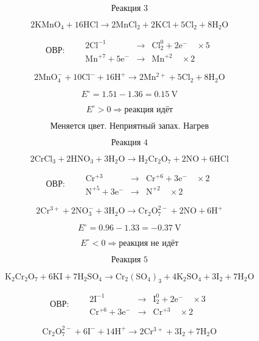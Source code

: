 \documentclass[a4paper, 12pt]{article}
\begin{document}
\[
    \boxed{\text{Реакция 3}}
\]

\[
    \mathrm{2KMnO_4 + 16HCl
        \rightarrow 2MnCl_2 + 2KCl + 5Cl_2 + 8H_2O}
\]

\[
    \text{ОВР:}\qquad
    \begin{array}{rcl}
        \mathrm{2Cl^{-1}}       & \rightarrow & \mathrm{Cl_2^0 + 2e^-} \quad \times 5 \\
        \mathrm{Mn^{+7} + 5e^-} & \rightarrow & \mathrm{Mn^{+2}} \quad \times 2
    \end{array}
\]

\[
    \mathrm{2MnO_4^- + 10Cl^- + 16H^+
        \rightarrow 2Mn^{2+} + 5Cl_2 + 8H_2O}
\]

\[
    E^\circ = 1.51 - 1.36 = 0.15\ \mathrm{V}
\]

\[
    \boxed{E^\circ > 0 \Rightarrow \text{реакция идёт}}
\]

\[
    \text{Меняется цвет. Неприятный запах. Нагрев}
\]

\[
    \boxed{\text{Реакция 4}}
\]

\[
    \mathrm{2CrCl_3 + 2HNO_3 + 3H_2O
        \rightarrow H_2Cr_2O_7 + 2NO + 6HCl}
\]

\[
    \text{ОВР:}\qquad
    \begin{array}{rcl}
        \mathrm{Cr^{+3}}       & \rightarrow & \mathrm{Cr^{+6} + 3e^-} \quad \times 2 \\
        \mathrm{N^{+5} + 3e^-} & \rightarrow & \mathrm{N^{+2}} \quad \times 2
    \end{array}
\]

\[
    \mathrm{2Cr^{3+} + 2NO_3^- + 3H_2O
    \rightarrow Cr_2O_7^{2-} + 2NO + 6H^+}
\]

\[
    E^\circ = 0.96 - 1.33 = -0.37\ \mathrm{V}
\]

\[
    \boxed{E^\circ < 0 \Rightarrow \text{реакция не идёт}}
\]

\[
    \boxed{\text{Реакция 5}}
\]

\[
    \mathrm{K_2Cr_2O_7 + 6KI + 7H_2SO_4
        \rightarrow Cr_2(SO_4)_3 + 4K_2SO_4 + 3I_2 + 7H_2O}
\]

\[
    \text{ОВР:}\qquad
    \begin{array}{rcl}
        \mathrm{2I^{-1}}        & \rightarrow & \mathrm{I_2^0 + 2e^-} \quad \times 3 \\
        \mathrm{Cr^{+6} + 3e^-} & \rightarrow & \mathrm{Cr^{+3}} \quad \times 2
    \end{array}
\]

\[
    \mathrm{Cr_2O_7^{2-} + 6I^- + 14H^+
    \rightarrow 2Cr^{3+} + 3I_2 + 7H_2O}
\]
\end{document}
